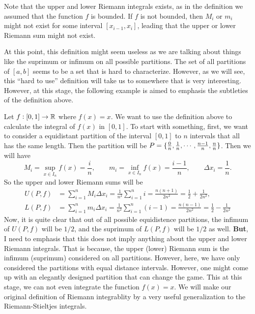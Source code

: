 \begin{remark}
	Note that the upper and lower Riemann integrals exists, as in the definition we assumed that the function $f$ is bounded. If $f$ is not bounded, then $M_i$ or $m_i$ might not exist for some interval $[x_{i-1}, x_i]$, leading that the upper or lower Riemann sum might not exist. 
\end{remark}
At this point, this definition might seem useless as we are talking about things like the suprimum or infimum on all possible partitions. The set of all partitions of $[a,b]$ seems to be a set that is hard to characterize. However, as we will see, this ``hard to use'' definition will take us to somewhere that is very interesting. However, at this stage, the following example is aimed to emphasis the subtleties of the definition above.
\begin{example}[Attempting to integrate $f(x)=x$]
	Let $f: [0,1] \to \mathbb{R}$ where $f(x)=x$. We want to use the definition above to calculate the integral of $f(x)$ in $[0,1]$. To start with something, first, we want to consider a equidistant partition of the interval $[0,1]$ to $n$ intervals that all has the same length. Then the partition will be $P = \{\frac{0}{n},\frac{1}{n},\cdots,\frac{n-1}{n},\frac{n}{n}\}$. Then we will have
	\[ M_i = \sup_{x\in I_n} f(x) = \frac{i}{n}, \qquad m_i = \inf_{x\in I_n} f(x) = \frac{i-1}{n}, \qquad \Delta x_i = \frac{1}{n}. \]
	So the upper and lower Riemann sums will be
	\begin{align*}
		U(P,f) &= \sum_{i=1}^{n} M_i \Delta x_i = \frac{1}{n^2} \sum_{i=1}^{n}i = \frac{n(n+1)}{2n^2} = \frac{1}{2} + \frac{1}{2n^2}, \\
		L(P,f) &= \sum_{i=1}^{n} m_i \Delta x_i = \frac{1}{n^2} \sum_{i=1}^{n}(i-1) = \frac{n(n-1)}{2n^2} = \frac{1}{2} - \frac{1}{2n^2}
	\end{align*}
	Now, it is quite clear that out of all possible equidistence partitions, the infimum of $U(P,f)$ will be $1/2$, and the suprimum of $L(P,f)$ will be $1/2$ as well. \textbf{But}, I need to emphasis that this does not imply anything about the upper and lower Riemann integrals. That is because, the upper (lower) Riemann sum is the infimum (suprimum) considered on all partitions. However, here, we have only considered the partitions with equal distance intervals. However, one might come up with an elegantly designed partition that can change the game. This at this stage, we can not even integrate the function $f(x) = x$. We will make our original definition of Riemann integrablity by a very useful generalization to the Riemann-Stieltjes integrals.
\end{example}

